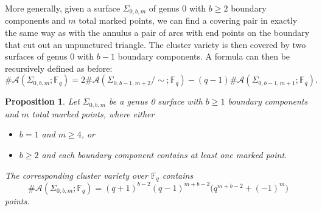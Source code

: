 \documentclass[reqno,12pt]{amsart}
\newtheorem{prop}[thm]{Proposition}
\theoremstyle{definition}
\theoremstyle{remark}
\theoremstyle{remark}
\numberwithin{equation}{section}
\begin{document}
More generally, given a surface $\Sigma_{0,b,m}$ of genus 0 with $b\geq 2$ boundary components and $m$ total marked points, we can find a covering pair in exactly the same way as with the annulus \textemdash a pair of arcs with end points on the boundary that cut out an unpunctured triangle. The cluster variety is then covered by two surfaces of genus 0 with $b-1$ boundary components. A formula can then be recursively defined as before: \[ \#\mathcal{A}(\Sigma_{0,b,m}; \mathbb{F}_q) =  2\#\mathcal{A}(\Sigma_{0,b-1,m+2}/\!\sim; \mathbb{F}_q) - (q-1) \#\mathcal{A}(\Sigma_{0,b-1,m+1}; \mathbb{F}_q).\]
\begin{prop}\label{prop:genus 0 points}
    Let $\Sigma_{0,b,m}$ be a genus 0 surface with $b\geq 1$ boundary components and $m$ total marked points, where either 
    \begin{itemize}
        \item $b = 1$ and $m\geq 4$, or
        \item $b \geq 2$ and each boundary component contains at least one marked point.
    \end{itemize}
    The corresponding cluster variety over $\mathbb{F}_q$ contains \[ \#\mathcal{A}(\Sigma_{0,b,m}; \mathbb{F}_q) = (q+1)^{b-2} (q-1)^{m+b-2} \big( q^{m+b-2} + (-1)^{m}\big) \] points.
\end{prop}
\end{document}
